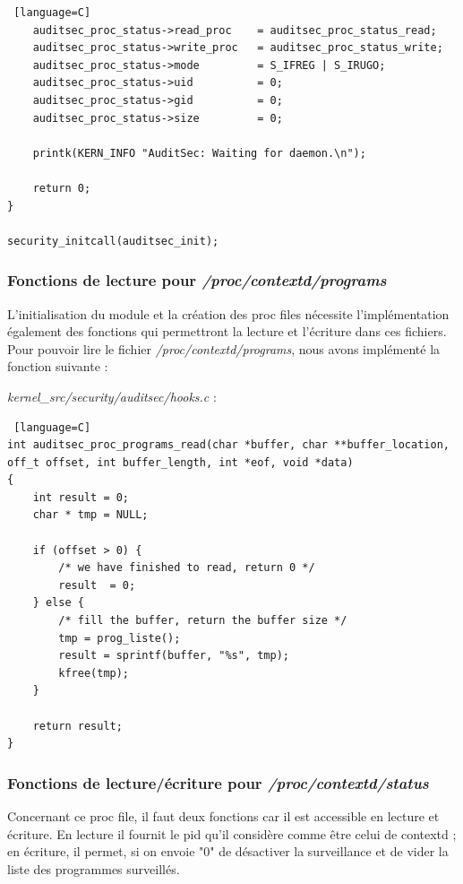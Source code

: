 \documentclass[pdftex,a4paper,titlepage,11pt]{article}
\begin{document}
\begin{lstlisting} [language=C]
	auditsec_proc_status->read_proc    = auditsec_proc_status_read;
	auditsec_proc_status->write_proc   = auditsec_proc_status_write;
	auditsec_proc_status->mode         = S_IFREG | S_IRUGO;
	auditsec_proc_status->uid          = 0;
	auditsec_proc_status->gid          = 0;
	auditsec_proc_status->size         = 0;

	printk(KERN_INFO "AuditSec: Waiting for daemon.\n");

	return 0;
}

security_initcall(auditsec_init);
\end{lstlisting}

\subsubsection{Fonctions de lecture pour \textit{/proc/contextd/programs}}

L'initialisation du module et la création des proc files nécessite l'implémentation également des fonctions qui permettront la lecture et l'écriture dans ces fichiers. Pour pouvoir lire le fichier \textit{/proc/contextd/programs}, nous avons implémenté la fonction suivante :

\textit{{kernel\_src}/security/auditsec/hooks.c} :
\begin{lstlisting} [language=C]
int auditsec_proc_programs_read(char *buffer, char **buffer_location,  off_t offset, int buffer_length, int *eof, void *data)
{
	int result = 0;
	char * tmp = NULL;
	
	if (offset > 0) {
		/* we have finished to read, return 0 */
		result  = 0;
	} else {
		/* fill the buffer, return the buffer size */
		tmp = prog_liste();
		result = sprintf(buffer, "%s", tmp);
		kfree(tmp);
	}

	return result;
}
\end{lstlisting}

\subsubsection{Fonctions de lecture/écriture pour \textit{/proc/contextd/status}}

Concernant ce proc file, il faut deux fonctions car il est accessible en lecture et écriture. En lecture il fournit le pid qu'il considère comme être celui de contextd ; en écriture, il permet, si on envoie "0" de désactiver la surveillance et de vider la liste des programmes surveillés.
\end{document}
